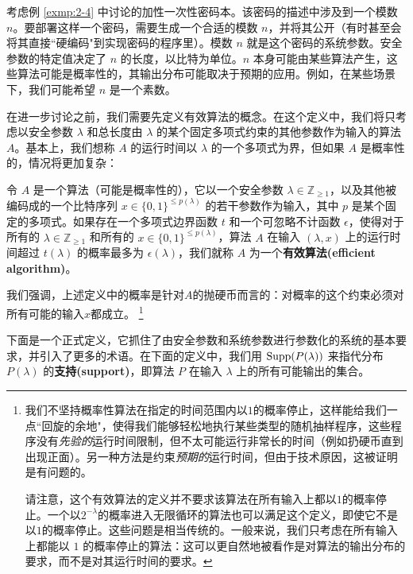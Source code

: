\begin{example}\label{exmp:2-12}
考虑例 \ref{exmp:2-4} 中讨论的加性一次性密码本。该密码的描述中涉及到一个模数 $n$。要部署这样一个密码，需要生成一个合适的模数 $n$，并将其公开（有时甚至会将其直接``硬编码"到实现密码的程序里）。模数 $n$ 就是这个密码的系统参数。安全参数的特定值决定了 $n$ 的长度，以比特为单位。$n$ 本身可能由某些算法产生，这些算法可能是概率性的，其输出分布可能取决于预期的应用。例如，在某些场景下，我们可能希望 $n$ 是一个素数。
\end{example}

在进一步讨论之前，我们需要先定义有效算法的概念。在这个定义中，我们将只考虑以安全参数 $\lambda$ 和总长度由 $\lambda$ 的某个固定多项式约束的其他参数作为输入的算法 $A$。基本上，我们想称 $A$ 的运行时间以 $\lambda$ 的一个多项式为界，但如果 $A$ 是概率性的，情况将更加复杂：

\begin{definition}[有效算法]
令 $A$ 是一个算法（可能是概率性的），它以一个安全参数 $\lambda\in\mathbb{Z}_{\geq1}$，以及其他被编码成的一个比特序列 $x\in\{0,1\}^{\leq p(\lambda)}$ 的若干参数作为输入，其中 $p$ 是某个固定的多项式。如果存在一个多项式边界函数 $t$ 和一个可忽略不计函数 $\epsilon$，使得对于所有的 $\lambda\in\mathbb{Z}_{\geq1}$ 和所有的 $x\in\{0,1\}^{\leq p(\lambda)}$，算法 $A$ 在输入 $(\lambda,x)$ 上的运行时间超过 $t(\lambda)$ 的概率最多为 $\epsilon(\lambda)$，我们就称 $A$ 为一个\textbf{有效算法(efficient algorithm)}。
\end{definition}

我们强调，上述定义中的概率是针对$A$的抛硬币而言的：对概率的这个约束必须对所有可能的输入$x$都成立。
\footnote{
\label{foot:2-1}
我们不坚持概率性算法在指定的时间范围内以$1$的概率停止，这样能给我们一点``回旋的余地"，使得我们能够轻松地执行某些类型的随机抽样程序，这些程序没有\emph{先验的}运行时间限制，但不太可能运行非常长的时间（例如扔硬币直到出现正面）。另一种方法是约束\emph{预期的}运行时间，但由于技术原因，这被证明是有问题的。

请注意，这个有效算法的定义并不要求该算法在所有输入上都以$1$的概率停止。一个以$2^{-\lambda}$的概率进入无限循环的算法也可以满足这个定义，即使它不是以$1$的概率停止。这些问题是相当传统的。一般来说，我们只考虑在所有输入上都能以 $1$ 的概率停止的算法：这可以更自然地被看作是对算法的输出分布的要求，而不是对其运行时间的要求。
}

\vspace{5pt}

下面是一个正式定义，它抓住了由安全参数和系统参数进行参数化的系统的基本要求，并引入了更多的术语。在下面的定义中，我们用 ${\rm Supp}(P(\lambda))$ 来指代分布 $P(\lambda)$ 的\textbf{支持(support)}，即算法 $P$ 在输入 $\lambda$ 上的所有可能输出的集合。


